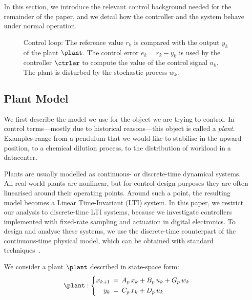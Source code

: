 In this section, we introduce the relevant control background needed for the remainder of the paper, and we detail how the controller and the system behave under normal operation.

\begin{figure}[t]
\centering

\caption{Control loop: The reference value $r_k$ is compared with the output $y_k$ of the plant $\plant$.
    The control error $e_k = r_k - y_k$ is used by the controller $\ctrler$ to compute the value of the control signal $u_k$.
    The plant is disturbed by the stochastic process $w_k$.}
\label{fig:loop}
\end{figure}

\subsection{Plant Model}

We first describe the model we use for the object we are trying to control.
In control terms---mostly due to historical reasons---this object is called a \emph{plant}.
Examples range from a pendulum that we would like to stabilise in the upward position, to a chemical dilution process, to the distribution of workload in a datacenter.

Plants are usually modelled as continuous- or discrete-time dynamical systems. 
All real-world plants are nonlinear, but for control design purposes they are often linearised around their operating points.
Around such a point, the resulting model becomes a Linear Time-Invariant (LTI) system.
In this paper, we restrict our analysis to discrete-time LTI systems, because we investigate controllers implemented with fixed-rate sampling and actuation in digital electronics.
To design and analyse these systems, we use the discrete-time counterpart of the continuous-time physical model, which can be obtained with standard techniques~\cite{Astrom:1997}.

We consider a plant $\plant$ described in state-space form:
\begin{equation}
\label{eq:background:plant}
    \plant : \left\{
    \begin{aligned}
        x_{k+1} &\,=\,  A_p\,x_k + B_p\,u_k + G_p\,w_k \\
        y_k &\,=\, C_p\,x_k + D_p\,u_k
    \end{aligned}
    \right.
\end{equation}

